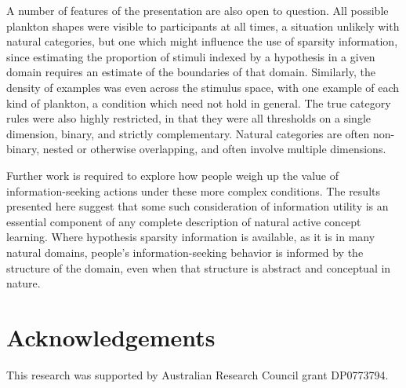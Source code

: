 \documentclass[10pt,letterpaper]{article}
\begin{document}
 A number of features of the presentation are also open to question. All possible plankton shapes were visible to participants at all times, a situation unlikely with natural categories, but one which might influence the use of sparsity information, since estimating the proportion of stimuli indexed by a hypothesis in a given domain requires an estimate of the boundaries of that domain. Similarly, the density of examples was even across the stimulus space, with one example of each kind of plankton, a condition which need not hold in general. The true category rules were also highly restricted, in that they were all thresholds on a single dimension, binary, and strictly complementary. Natural categories are often non-binary, nested or otherwise overlapping, and often involve multiple dimensions. 

Further work is required to explore how people weigh up the value of information-seeking actions under these more complex conditions. The results presented here suggest that some such consideration of information utility is an essential component of any complete description of natural active concept learning. Where hypothesis sparsity information is available, as it is in many natural domains, people's information-seeking behavior is informed by the structure of the domain, even when that structure is abstract and conceptual in nature.

\section{Acknowledgements}

This research was supported by Australian Research Council grant DP0773794.

\renewcommand{\bibliographytypesize}{\footnotesize}


\setlength{\bibleftmargin}{.125in}
\setlength{\bibindent}{-\bibleftmargin}



\end{document}
